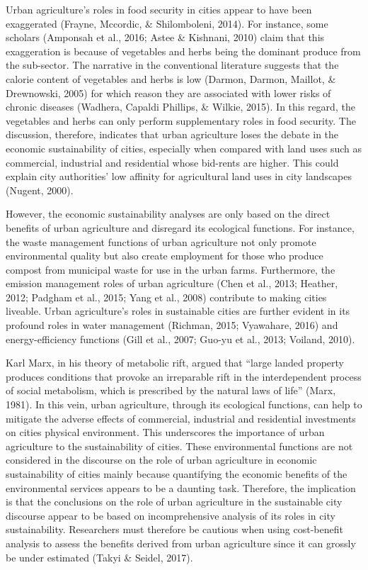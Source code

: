 Urban agriculture's roles in food security in cities appear to have been exaggerated (Frayne, Mccordic, \& Shilomboleni, 2014). For instance, some scholars (Amponsah et al., 2016; Astee \& Kishnani, 2010) claim that this exaggeration is because of vegetables and herbs being the dominant produce from the sub-sector. The narrative in the conventional literature suggests that the calorie content of vegetables and herbs is low (Darmon, Darmon, Maillot, \& Drewnowski, 2005) for which reason they are associated with lower risks of chronic diseases (Wadhera, Capaldi Phillips, \& Wilkie, 2015). In this regard, the vegetables and herbs can only perform supplementary roles in food security. The discussion, therefore, indicates that urban agriculture loses the debate in the economic sustainability of cities, especially when compared with land uses such as commercial, industrial and residential whose bid-rents are higher. This could explain city authorities' low affinity for agricultural land uses in city landscapes (Nugent, 2000).

However, the economic sustainability analyses are only based on the direct benefits of urban agriculture and disregard its ecological functions. For instance, the waste management functions of urban agriculture not only promote environmental quality but also create employment for those who produce compost from municipal waste for use in the urban farms. Furthermore, the emission management roles of urban agriculture (Chen et al., 2013; Heather, 2012; Padgham et al., 2015; Yang et al., 2008) contribute to making cities liveable. Urban agriculture's roles in sustainable cities are further evident in its profound roles in water management (Richman, 2015; Vyawahare, 2016) and energy-efficiency functions (Gill et al., 2007; Guo-yu et al., 2013; Voiland, 2010).

Karl Marx, in his theory of metabolic rift, argued that “large landed property produces conditions that provoke an irreparable rift in the interdependent process of social metabolism, which is prescribed by the natural laws of life” (Marx, 1981). In this vein, urban agriculture, through its ecological functions, can help to mitigate the adverse effects of commercial, industrial and residential investments on cities physical environment. This underscores the importance of urban agriculture to the sustainability of cities. These environmental functions are not considered in the discourse on the role of urban agriculture in economic sustainability of cities mainly because quantifying the economic benefits of the environmental services appears to be a daunting task. Therefore, the implication is that the conclusions on the role of urban agriculture in the sustainable city discourse appear to be based on incomprehensive analysis of its roles in city sustainability. Researchers must therefore be cautious when using cost-benefit analysis to assess the benefits derived from urban agriculture since it can grossly be under estimated (Takyi \& Seidel, 2017).

